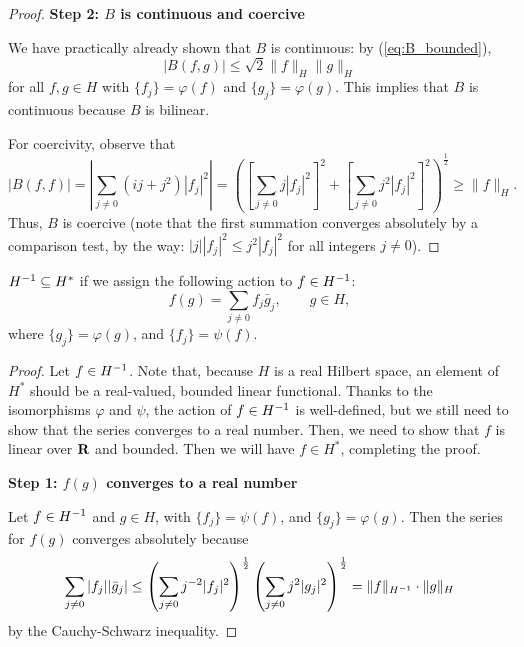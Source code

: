 \documentclass{homework}
\begin{document}
\begin{arabicparts}
\begin{proof}
			\textbf{Step 2: $B$ is continuous and coercive}
			
			We have practically already shown that $B$ is continuous: by (\ref{eq:B_bounded}),
			\begin{equation}
				|B(f,g)| \le \sqrt{2}\lVert f\rVert_H\lVert g\rVert_H
			\end{equation}
			for all $f,g\in H$ with $\{f_j\} = \varphi(f)$ and $\{g_j\} = \varphi(g)$. This implies that $B$ is continuous because $B$ is bilinear.
			
			For coercivity, observe that
			\begin{equation}
				|B(f,f)| = \left|\sum_{j\ne0}(ij+j^2)|f_j|^2\right| = \left(\left[\sum_{j\ne0}j|f_j|^2\right]^2 + \left[\sum_{j\ne0}j^2|f_j|^2\right]^2\right)^\frac{1}{2} \ge \lVert f\rVert_H.
			\end{equation}
			Thus, $B$ is coercive (note that the first summation converges absolutely by a comparison test, by the way: $|j||f_j|^2 \le j^2|f_j|^2$ for all integers $j \ne 0$).
		\end{proof}
		
		\questionpart
		${H^{-1}} \subseteq H^*$ if we assign the following action to $f \in {H^{-1}}$:
		\begin{equation}
			f(g) = \sum_{j\ne0}f_j\bar{g}_j, \qquad g\in H,
		\end{equation}
		where $\{g_j\}=\varphi(g)$, and $\{f_j\} = \psi(f)$.
		
		\begin{proof}
			Let $f\in {H^{-1}}$. Note that, because $H$ is a real Hilbert space, an element of $H^*$ should be a real-valued, bounded linear functional. Thanks to the isomorphisms $\varphi$ and $\psi$, the action of $f \in {H^{-1}}$ is well-defined, but we still need to show that the series converges to a real number. Then, we need to show that $f$ is linear over $\textbf{R}$ and bounded. Then we will have $f \in H^*$, completing the proof.
			
			\textbf{Step 1: $f(g)$ converges to a real number}
			
			Let $f \in {H^{-1}}$ and $g\in H$, with $\{f_j\} = \psi(f)$, and $\{g_j\} = \varphi(g)$. Then the series for $f(g)$ converges absolutely because
			\begin{equation}
				\label{eq:f_bounded}
				\sum_{j\ne0}|f_j||\bar{g}_j| \le \left(\sum_{j\ne0}j^{-2}|f_j|^2\right)^\frac{1}{2}\left(\sum_{j\ne0}j^2|g_j|^2\right)^\frac{1}{2} = \lVert f\rVert_{H^{-1}}\cdot\lVert g\rVert_H
			\end{equation}
			by the Cauchy-Schwarz inequality.
			

\end{proof}
\end{arabicparts}
\end{document}
